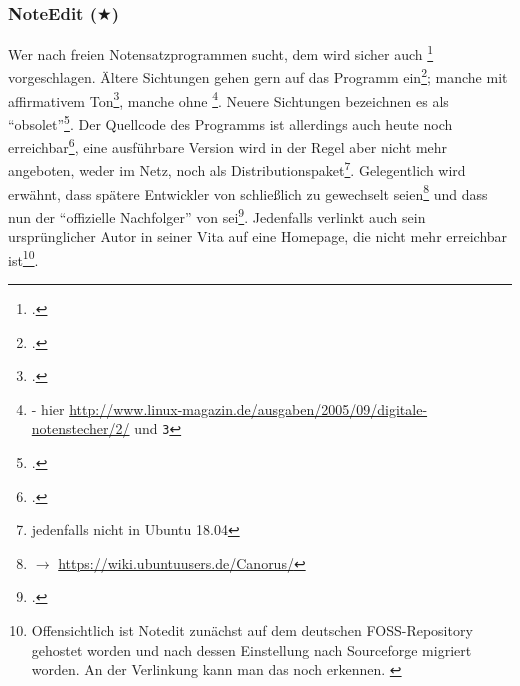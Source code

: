 %
%
%



\subsubsection{NoteEdit ($\bigstar$)}

Wer nach freien Notensatzprogrammen sucht, dem wird sicher auch
\footcite[vgl.][\nopage wp]{Andres2002a} vorgeschlagen. Ältere
Sichtungen gehen gern auf das Programm ein\footcite[vgl.][\nopage
wp]{Roitman2007a}; manche mit affirmativem Ton\footcite[vgl.][\nopage
wp]{LinuxSoundNotation2006a}, manche ohne
\footnote{\cite[vgl.][\nopage]{Brendel2005a} - hier
\href{http://www.linux-magazin.de/ausgaben/2005/09/digitale-notenstecher/2/}
{http://www.linux-magazin.de/ausgaben/2005/09/digitale-notenstecher/2/} und
\texttt{\/3\/}}. Neuere Sichtungen bezeichnen es als
\enquote{obsolet}\footcite[vgl.][\nopage wp]{WpedNotensatz2019a}.
Der Quellcode des Programms ist allerdings auch heute noch
erreichbar\footcite[vgl.][\nopage]{NoteeditRep2014a}, eine ausführbare Version
wird in der Regel aber nicht mehr angeboten, weder im Netz, noch als
Distri\-bu\-tions\-paket\footnote{jedenfalls nicht in Ubuntu 18.04}. Gelegentlich wird
erwähnt, dass spätere Entwickler von  schließlich zu 
gewechselt seien\footnote{$\rightarrow$
\href{https://wiki.ubuntuusers.de/Canorus/}{https://wiki.ubuntuusers.de/Canorus/}
} und dass  nun der \enquote{offizielle Nachfolger} von
 sei\footcite[vgl.][\nopage wp]{WpedCanorus2019a}.
Jedenfalls verlinkt auch sein ursprünglicher Autor  in seiner Vita
auf eine Homepage, die nicht mehr erreichbar ist\footnote{Offensichtlich ist
Notedit zunächst auf dem deutschen FOSS-Repository  gehostet worden
und nach dessen Einstellung nach Sourceforge migriert worden. An der Verlinkung
kann man das noch erkennen. \cite[vgl. dazu][\nopage wp]{Andres2018a}}.


